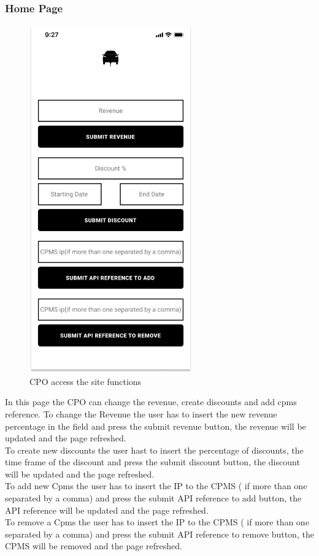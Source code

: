 \subsubsection{Home Page}
\begin{figure}[H]
    \centering
    \includegraphics[keepaspectratio, height=15cm]{Mockup/CPOAppInterface/Homepage.png}
    \caption{\ac{CPO} access the site functions}
    \label{site:Homepage}
\end{figure}
In this page the \ac{CPO} can change the revenue, create discounts and add cpms reference.
To change the Revenue the user has to insert the new revenue percentage in the field and press the submit revenue button, the revenue will be updated and the page refreshed.\\
To create new discounts the user hast to insert the percentage of discounts, the time frame of the discount and press the submit discount button, the discount will be updated and the page refreshed.\\
To add new Cpms the user has to insert the IP to the \ac{CPMS} ( if more than one separated by a comma) and press the submit \ac{API} reference to add button, the \ac{API} reference will be updated and the page refreshed.\\
To remove a Cpms the user has to insert the IP to the \ac{CPMS} ( if more than one separated by a comma) and press the submit \ac{API} reference to remove button, the \ac{CPMS} will be removed and the page refreshed.\\

